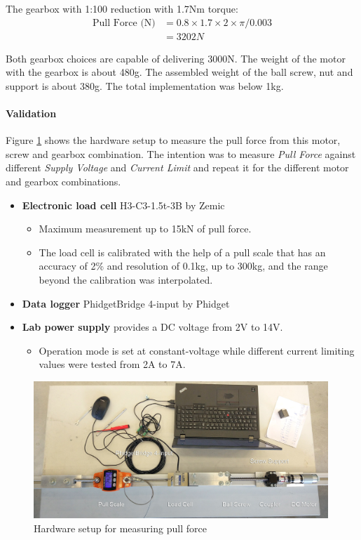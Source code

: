 The gearbox with 1:100 reduction with 1.7Nm torque:
\begin{align*}
    \textrm{Pull Force (N)} &= 0.8 \times 1.7 \times 2 \times \pi / 0.003\\
                            &= 3202N
\end{align*}

Both gearbox choices are capable of delivering 3000N. The weight of the motor with the gearbox is about 480g. The assembled weight of the ball screw, nut and support is about 380g. The total implementation was below 1kg. 

\paragraph{Validation}

Figure \ref{fig:pull-force-measurement} shows the hardware setup to measure the pull force from this motor, screw and gearbox combination. The intention was to measure \textit{Pull Force} against different \textit{Supply Voltage} and \textit{Current Limit} and repeat it for the different motor and gearbox combinations.

\begin{itemize}[nosep]
    \item \textbf{Electronic load cell} H3-C3-1.5t-3B by Zemic
    \begin{itemize}
        \item Maximum measurement up to 15kN of pull force. 
        \item The load cell is calibrated with the help of a pull scale that has an accuracy of 2\% and resolution of 0.1kg, up to 300kg, and the range beyond the calibration was interpolated. 
    \end{itemize}
    \item \textbf{Data logger} PhidgetBridge 4-input by Phidget 
    \item \textbf{Lab power supply} provides a DC voltage from 2V to 14V. 
    \begin{itemize}
        \item Operation mode is set at constant-voltage while different current limiting values were tested from 2A to 7A. 
    \end{itemize}
\end{itemize}

\begin{figure}
    \centering
    \includegraphics[width=0.99\textwidth]{images/05/image94.jpg}
    \caption{Hardware setup for measuring pull force}
    \label{fig:pull-force-measurement}
\end{figure}

